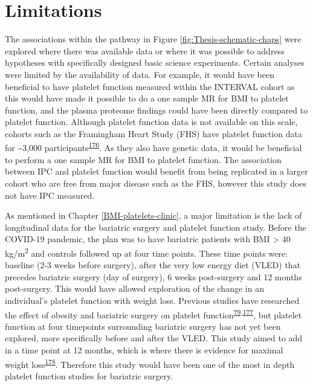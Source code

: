 \documentclass[11pt,twoside]{bristolthesis}
\begin{document}
\hypertarget{limitations}{%
\section{Limitations}\label{limitations}}

The associations within the pathway in Figure \ref{fig:Thesis-schematic-chaps} were explored where there was available data or where it was possible to address hypotheses with specifically designed basic science experiments. Certain analyses were limited by the availability of data. For example, it would have been beneficial to have platelet function measured within the INTERVAL cohort as this would have made it possible to do a one sample MR for BMI to platelet function, and the plasma proteome findings could have been directly compared to platelet function. Although platelet function data is not available on this scale, cohorts such as the Framingham Heart Study (FHS) have platelet function data for \textasciitilde3,000 participants\textsuperscript{\protect\hyperlink{ref-Rodriguez2020}{176}}. As they also have genetic data, it would be beneficial to perform a one sample MR for BMI to platelet function. The association between IPC and platelet function would benefit from being replicated in a larger cohort who are free from major disease such as the FHS, however this study does not have IPC measured.

As mentioned in Chapter \ref{BMI-platelets-clinic}, a major limitation is the lack of longitudinal data for the bariatric surgery and platelet function study. Before the COVID-19 pandemic, the plan was to have bariatric patients with BMI \textgreater{} 40 kg/m\textsuperscript{2} and controls followed up at four time points. These time points were: baseline (2-3 weeks before surgery), after the very low energy diet (VLED) that precedes bariatric surgery (day of surgery), 6 weeks post-surgery and 12 months post-surgery. This would have allowed exploration of the change in an individual's platelet function with weight loss. Previous studies have researched the effect of obesity and bariatric surgery on platelet function\textsuperscript{\protect\hyperlink{ref-Barrachina2019}{79},\protect\hyperlink{ref-Dobrydneva2012}{177}}, but platelet function at four timepoints surrounding bariatric surgery has not yet been explored, more specifically before and after the VLED. This study aimed to add in a time point at 12 months, which is where there is evidence for maximal weight loss\textsuperscript{\protect\hyperlink{ref-Maciejewski2016}{178}}. Therefore this study would have been one of the most in depth platelet function studies for bariatric surgery.
\end{document}
